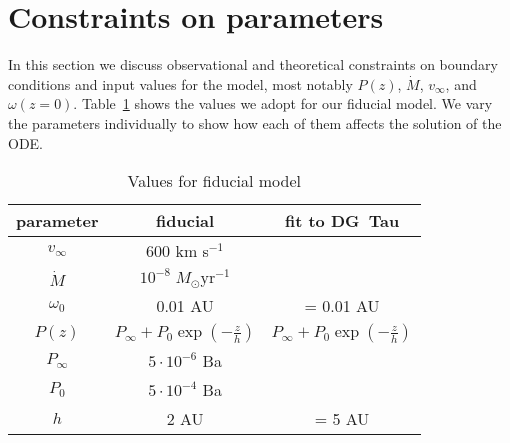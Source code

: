 \section{Constraints on parameters}
\label{sect:parameters}
In this section we discuss observational and theoretical constraints on boundary conditions and input values for the model, most notably $P(z)$, $\dot M$, $v_\infty$, and $\omega(z=0)$. Table~\ref{tab:fiducial} shows the values we adopt for our fiducial model. We vary the parameters individually to show how each of them affects the solution of the ODE. 
\begin{table}
\label{tab:fiducial}
\caption{Values for fiducial model}
\begin{tabular}{ccc}
\hline\hline
parameter & fiducial & fit to DG~Tau\\
\hline
$v_\infty$ & 600 km s$^{-1}$\\
$\dot M$ & $10^{-8}\;M_\odot\textrm{yr}^{-1}$\\
$\omega_0$ & 0.01 AU & = 0.01 AU\\
$P(z)$ & $P_\infty+P_0\exp\left(-\frac{z}{h}\right)$ & $P_\infty+P_0\exp\left(-\frac{z}{h}\right)$\\
$P_\infty$ & $5\cdot 10^{-6}$ Ba\\
$P_0$ & $5\cdot 10^{-4}$ Ba\\
$h$ & 2 AU & = 5 AU\\
\hline
\end{tabular}
\end{table}